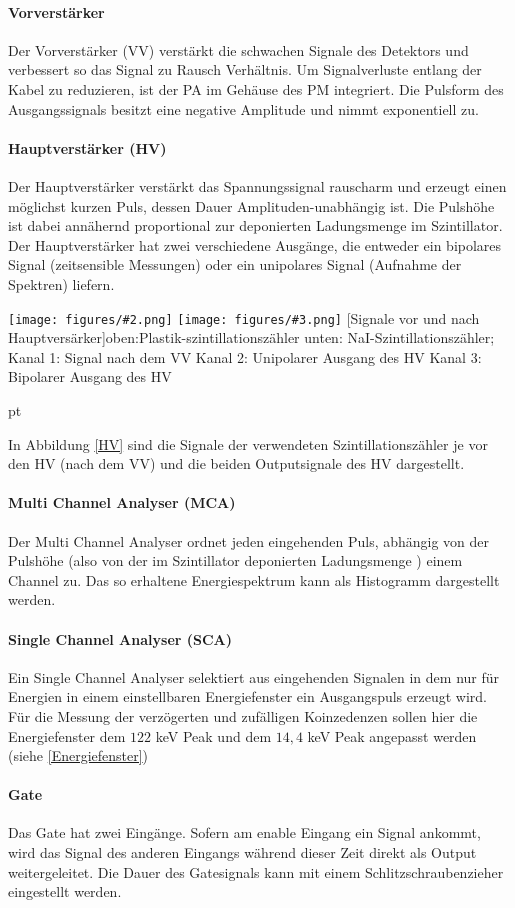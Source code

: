 \documentclass[12pt,listof=totoc]{scrartcl}
\newcommand{\graTwoShort}[5][0.49]{
	\begin{minipage}[h!]{\textwidth}
		\centering
		\texttt{[image: figures/\#2.png]}
		\texttt{[image: figures/\#3.png]}
		\captionof{figure}[#4]{#5}
	\end{minipage}
	\vskip 30 pt
}
\begin{document}
 \paragraph{Vorverstärker}
 Der Vorverstärker (VV) verstärkt die schwachen Signale des Detektors und verbessert so
 das Signal zu Rausch Verhältnis. Um Signalverluste entlang der Kabel zu reduzieren, ist der PA im Gehäuse des PM integriert. Die Pulsform des Ausgangssignals besitzt eine negative Amplitude und nimmt exponentiell zu.
 \paragraph{Hauptverstärker (HV)}
 Der Hauptverstärker  verstärkt das Spannungssignal rauscharm und erzeugt einen möglichst kurzen Puls, dessen Dauer Amplituden-unabhängig ist. Die Pulshöhe ist dabei annähernd proportional zur deponierten Ladungsmenge im Szintillator. Der Hauptverstärker hat zwei verschiedene Ausgänge, die entweder ein bipolares Signal (zeitsensible Messungen) oder ein unipolares Signal (Aufnahme der Spektren) liefern.
 
 \graTwoShort[0.5]{Plastik-Verstaerker}{NaI-Verstaerker}{Signale vor und nach Hauptversärker}{oben:Plastik-szintillationszähler unten: NaI-Szintillationszähler; Kanal 1: Signal nach dem VV Kanal 2: Unipolarer Ausgang des HV Kanal 3: Bipolarer Ausgang des HV \label{HV}}
 
 In Abbildung \ref{HV} sind die Signale der verwendeten Szintillationszähler je vor den HV (nach dem VV) und die beiden Outputsignale des HV dargestellt.
 \paragraph{Multi Channel Analyser (MCA)}
 Der Multi Channel Analyser ordnet jeden eingehenden Puls, abhängig von der Pulshöhe (also von der im Szintillator deponierten Ladungsmenge ) einem Channel zu. Das so erhaltene Energiespektrum kann als Histogramm dargestellt werden.
 \paragraph{Single Channel Analyser (SCA)}
 Ein Single Channel Analyser selektiert aus eingehenden Signalen in dem nur für Energien in einem einstellbaren Energiefenster ein Ausgangspuls erzeugt wird.  Für die Messung der verzögerten und zufälligen Koinzedenzen sollen hier die Energiefenster dem $122$ keV Peak und dem $14,4$ keV Peak angepasst werden (siehe \ref{Energiefenster})
 \paragraph{Gate} Das Gate hat zwei Eingänge. Sofern am enable Eingang ein Signal ankommt, wird das Signal des anderen Eingangs während dieser Zeit direkt als Output weitergeleitet. Die Dauer des Gatesignals kann mit einem Schlitzschraubenzieher eingestellt werden.
\end{document}
